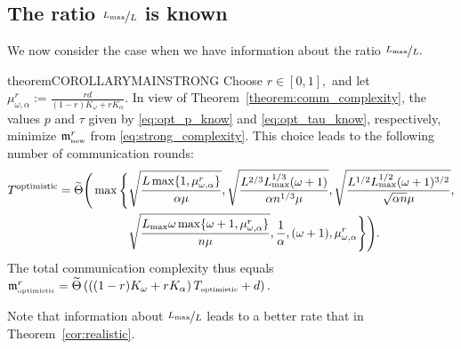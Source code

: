 \documentclass{article} %
\theoremstyle{plain}
\theoremstyle{definition}
\theoremstyle{remark}
\newcommand{\eqdef}{:=}
\newcommand{\squeeze}{\textstyle}
\begin{document}
\subsection{The ratio $\nicefrac{L_{\max}}{L}$ is known}
We now consider the case when we have information about the ratio $\nicefrac{L_{\max}}{L}.$ 


  

\begin{restatable}{theorem}{COROLLARYMAINSTRONG}
  \label{cor:optimistic}
Choose $r \in [0, 1],$ and let $\mu^r_{\omega, \alpha} \eqdef \frac{rd}{(1 - r) K_{\omega} + r K_{\alpha}}.$ In view of Theorem~\ref{theorem:comm_complexity}, the values $p$ and $\tau$ given by \eqref{eq:opt_p_know} and \eqref{eq:opt_tau_know}, respectively,
    minimize $\mathfrak{m}^{r}_{{\scriptscriptstyle \textnormal{new}}}$ from \eqref{eq:strong_complexity}. This choice leads to the following number of communication rounds:
    {\small 
    \begin{eqnarray}
    \begin{aligned}
      \label{eq:optimistic_compl}
      T^{\textnormal{optimistic}} = \widetilde{\Theta}\Bigg(\max\Bigg\{&\sqrt{\frac{L \max\{1, \mu^r_{\omega, \alpha}\}}{\alpha \mu}}, \sqrt{\frac{L^{2/3} L_{\max}^{1/3} (\omega + 1)}{\alpha n^{1/3} \mu}}, \sqrt{\frac{L^{1/2} L_{\max}^{1/2} (\omega + 1)^{3/2}}{\sqrt{\alpha n} \mu}}, \\
      &\sqrt{\frac{L_{\max} \omega \max\{\omega + 1, \mu^r_{\omega, \alpha}\}}{n \mu}}, \frac{1}{\alpha}, (\omega + 1), \mu^r_{\omega, \alpha}\Bigg\}\Bigg).
    \end{aligned}
    \end{eqnarray}}
    The total communication complexity thus equals $\squeeze\mathfrak{m}^{r}_{{\scriptscriptstyle \textnormal{optimistic}}} = \widetilde{\Theta}\left(\left((1 - r)K_{\omega} + r K_{\alpha}\right) T_{{\scriptscriptstyle \textnormal{optimistic}}} + d\right).$ 
\end{restatable}

Note that information about $\nicefrac{L_{\max}}{L}$ leads to a  better rate that in Theorem~\ref{cor:realistic}.
\end{document}
